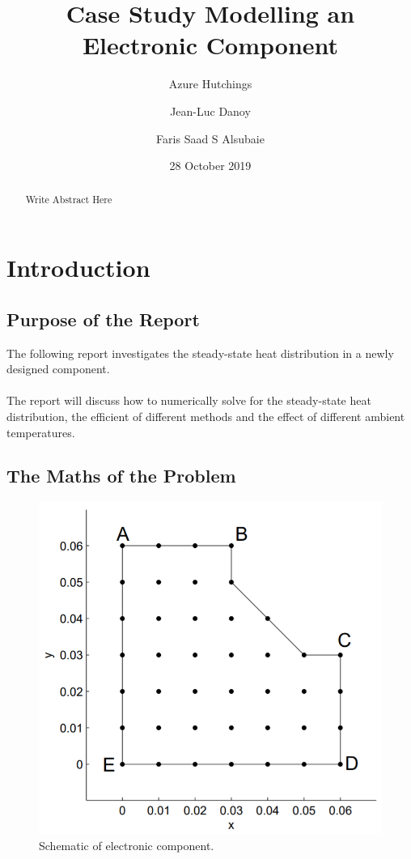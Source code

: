 \documentclass[12pt,a4paper]{article}
\title{Case Study Modelling an Electronic Component}
\author{
  Azure Hutchings
  \and
  Jean-Luc Danoy
  \and
  Faris Saad S Alsubaie
}
\date{28 October 2019}
\begin{document}
 
\begin{titlepage}
\maketitle
\end{titlepage}

\renewcommand{\abstractname}{Executive Summary}
\begin{abstract}
Write Abstract Here
\end{abstract}

\pagebreak

\tableofcontents

\pagebreak

\section{Introduction}

\subsection{Purpose of the Report}
The following report investigates the steady-state heat distribution in a newly designed component. 
\\\\
The report will discuss how to numerically solve for the steady-state heat distribution, the efficient of different methods and the effect of different ambient temperatures.

\subsection{The Maths of the Problem}

\begin{figure}[H]
	\center
	\includegraphics[width=0.9\linewidth]{images/Component.png}
	\caption{Schematic of electronic component.}
	\label{fig:componentSchematic}
\end{figure}
\end{document}
